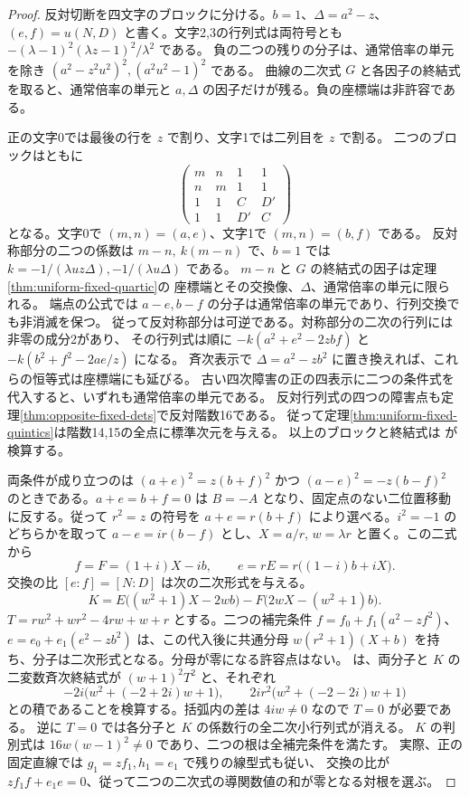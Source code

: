 \begin{proof}
反対切断を四文字のブロックに分ける。$b=1$、$\Delta=a^2-z$、
$(e,f)=u(N,D)$ と書く。文字2,3の行列式は両符号とも
$-(\lambda-1)^2(\lambda z-1)^2/\lambda^2$ である。
負の二つの残りの分子は、通常倍率の単元を除き
$(a^2-z^2u^2)^2,(a^2u^2-1)^2$ である。
曲線の二次式 $G$ と各因子の終結式を取ると、通常倍率の単元と
$a,\Delta$ の因子だけが残る。負の座標端は非許容である。

正の文字0では最後の行を $z$ で割り、文字1では二列目を $z$ で割る。
二つのブロックはともに
\[
 \begin{pmatrix}m&n&1&1\\ n&m&1&1\\1&1&C&D'\\1&1&D'&C\end{pmatrix}
\]
となる。文字0で $(m,n)=(a,e)$、文字1で $(m,n)=(b,f)$ である。
反対称部分の二つの係数は $m-n,\ k(m-n)$ で、$b=1$ では
$k=-1/(\lambda u z\Delta),-1/(\lambda u\Delta)$ である。
$m-n$ と $G$ の終結式の因子は定理\ref{thm:uniform-fixed-quartic}の
座標端とその交換像、$\Delta$、通常倍率の単元に限られる。
端点の公式では $a-e,b-f$ の分子は通常倍率の単元であり、行列交換でも非消滅を保つ。
従って反対称部分は可逆である。対称部分の二次の行列には非零の成分2があり、
その行列式は順に $-k(a^2+e^2-2zbf)$ と $-k(b^2+f^2-2ae/z)$ になる。
斉次表示で $\Delta=a^2-zb^2$ に置き換えれば、これらの恒等式は座標端にも延びる。
古い四次障害の正の四表示に二つの条件式を代入すると、いずれも通常倍率の単元である。
反対行列式の四つの障害点も定理\ref{thm:opposite-fixed-dets}で反対階数16である。
従って定理\ref{thm:uniform-fixed-quintics}は階数14,15の全点に標準次元を与える。
以上のブロックと終結式は  が検算する。

両条件が成り立つのは $(a+e)^2=z(b+f)^2$ かつ
$(a-e)^2=-z(b-f)^2$ のときである。$a+e=b+f=0$ は
$B=-A$ となり、固定点のない二位置移動に反する。従って $r^2=z$ の符号を
$a+e=r(b+f)$ により選べる。$i^2=-1$ のどちらかを取って
$a-e=ir(b-f)$ とし、$X=a/r$, $w=\lambda r$ と置く。この二式から
\[
 f=F=(1+i)X-ib,\qquad e=rE=r\big((1-i)b+iX\big).
\]
交換の比 $[e:f]=[N:D]$ は次の二次形式を与える。
\[
 K=E\big((w^2+1)X-2wb\big)-F\big(2wX-(w^2+1)b\big).
\]
$T=rw^2+wr^2-4rw+w+r$ とする。二つの補完条件
$f=f_0+f_1(a^2-zf^2)$、$e=e_0+e_1(e^2-zb^2)$ は、この代入後に共通分母
$w(r^2+1)(X+b)$ を持ち、分子は二次形式となる。分母が零になる許容点はない。
 は、両分子と $K$ の二変数斉次終結式が
$(w+1)^2T^2$ と、それぞれ
\[
  -2i\big(w^2+(-2+2i)w+1\big),\qquad
    2ir^2\big(w^2+(-2-2i)w+1\big)
\]
との積であることを検算する。括弧内の差は $4iw\ne0$ なので $T=0$ が必要である。
逆に $T=0$ では各分子と $K$ の係数行の全二次小行列式が消える。
$K$ の判別式は $16w(w-1)^2\ne0$ であり、二つの根は全補完条件を満たす。
実際、正の固定直線では $g_1=zf_1,h_1=e_1$ で残りの線型式も従い、
交換の比が $zf_1f+e_1e=0$、従って二つの二次式の導関数値の和が零となる対根を選ぶ。


\end{proof}
